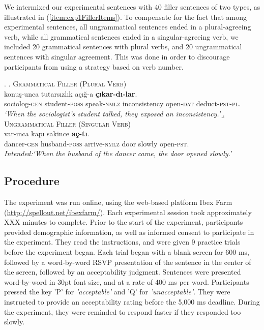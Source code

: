 \documentclass[doc,a4paper,man,natbib,floatsintext,noextraspace]{apa6}\usepackage[]{graphicx}\usepackage[]{color}
\begin{document}
We intermixed our experimental sentences with 40 filler sentences of two types, as illustrated in (\ref{item:exp1FillerItems}). To compensate for the fact that among experimental sentences, all ungrammatical sentences ended in a plural-agreeing verb, while all grammatical sentences ended in a singular-agreeing verb, we included 20 grammatical sentences with plural verbs, and 20 ungrammatical sentences with singular agreement. This was done in order to discourage participants from using a strategy based on verb number. 



\ex. \label{item:exp1FillerItems}
%
\a. \textsc{Grammatical Filler (Plural Verb)}\\ 
   konuş-unca tutarsızlık açığ-a \textbf{çıkar-dı-lar}.\\ 
  sociolog-\textsc{gen}  student-\textsc{poss} speak-\textsc{nmlz} inconsistency  open-\textsc{dat} deduct-\textsc{pst}-\textsc{pl}.\\
  \glt \textit{`When the sociologist's student talked, they exposed an inconsistency.'}
%
%
\b. \textsc{Ungrammatical Filler (Singular Verb)}\\ 
 var-ınca kapı sakince \textbf{aç-tı}.\\ 
dancer-\textsc{gen}  husband-\textsc{poss} arrive-\textsc{nmlz} door slowly  open-\textsc{pst}.\\
\glt \textit{Intended:`When the husband of the dancer came, the door opened slowly.'}

\subsection{Procedure} \label{sec:exp1:procedure}

The experiment was run online, using the web-based platform Ibex Farm (\url{http://spellout.net/ibexfarm/}). Each experimental session took approximately XXX minutes to complete.
%
Prior to the start of the experiment, participants provided demographic information, as well as informed consent to participate in the experiment. They read the instructions, and were given 9 practice trials before the experiment began.
%
Each trial began with a blank screen for 600 ms, followed by a word-by-word RSVP presentation of the sentence in the center of the screen, followed by an acceptability judgment. 
Sentences were presented word-by-word in 30pt font size, and at a rate of 400 ms per word. Participants pressed the key 'P' for \textit{'acceptable'} and 'Q' for \textit{'unacceptable'}. They were instructed to provide an acceptability rating before the 5,000 ms deadline. During the experiment, they were reminded to respond faster if they responded too slowly. 
\end{document}
